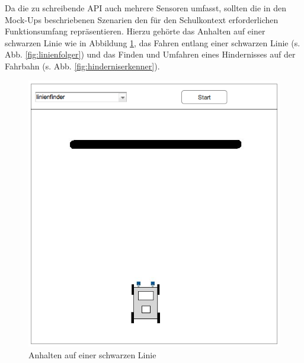 \documentclass[paper=a4, pagesize, DIV=calc, BCOR=12.5mm, twoside=on, onecolumn=on, open = any, titlepage =on, parskip =half-, headsepline = on, footsepline = on, chapterprefix = on, appendixprefix = off, fontsize = 12pt, numbers = noenddot, abstract = on]{scrbook}
\numberwithin{equation}{chapter}
\theoremstyle{definition}
\theoremstyle{plain}
\theoremstyle{plain}
\theoremstyle{remark}
\theoremstyle{plain}
\theoremstyle{plain}
\begin{document}
Da die zu schreibende API auch mehrere Sensoren umfasst, sollten die in den Mock-Ups beschriebenen Szenarien den für den Schulkontext erforderlichen Funktionsumfang repräsentieren. Hierzu gehörte das Anhalten auf einer schwarzen Linie wie in Abbildung \ref{fig:linienfinder}, das Fahren entlang einer schwarzen Linie (s. Abb. \ref{fig:linienfolger}) und das Finden und Umfahren eines Hindernisses auf der Fahrbahn (s. Abb. \ref{fig:hinderniserkenner}).

\begin{figure}[htbp]
\centering
\includegraphics[scale=0.4]{images/mockup_linienfinder.png}
\caption{Anhalten auf einer schwarzen Linie}
\label{fig:linienfinder}
\end{figure}
\end{document}
